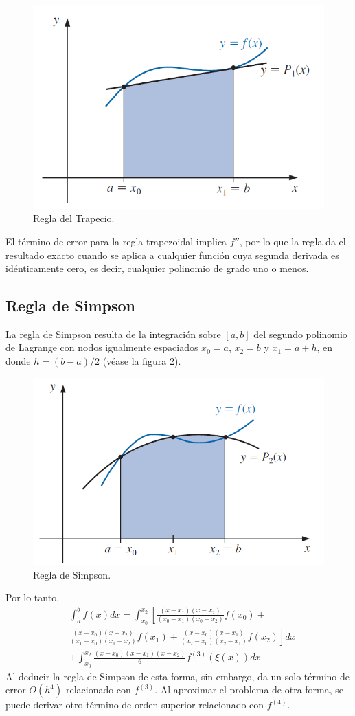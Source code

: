 \begin{figure}[h]
    \centering
    \includegraphics[width = 0.5 \textwidth]{Imagenes/5 - Regla del Trapecio.png}
    \caption{Regla del Trapecio.}
    \label{fig: Regla del Trapecio}
\end{figure}

El término de error para la regla trapezoidal implica $f''$, por lo que la regla da el resultado exacto cuando se aplica a cualquier función cuya segunda derivada es idénticamente cero, es decir, cualquier polinomio de grado uno o menos.

\subsection{Regla de Simpson}
La regla de Simpson resulta de la integración sobre $[a, b]$ del segundo polinomio de Lagrange con nodos igualmente espaciados $x_0 = a$, $x_2 = b$ y $x_1 = a + h$, en donde $h = (b - a)/2$ (véase la figura \ref{fig: Regla de Simpson}).

\begin{figure}[h]
    \centering
    \includegraphics[width = 0.5 \textwidth]{Imagenes/5 - Regla de Simpson.png}
    \caption{Regla de Simpson.}
    \label{fig: Regla de Simpson}
\end{figure}
Por lo tanto,
\begin{align*}
    & \int_{a}^{b} f(x) dx = \int_{x_0}^{x_2} \left[ \frac{(x - x_1)(x - x_2)}{(x_0 - x_1)(x_0 - x_2)} f(x_0) + \right. \\ 
    & \left. \frac{(x - x_0)(x - x_2)}{(x_1 - x_0)(x_1 - x_2)} f(x_1) + \frac{(x - x_0)(x - x_1)}{(x_2 - x_0)(x_2 - x_1)} f(x_2) \right] dx \\
    & + \int_{x_0}^{x_2} \frac{(x - x_0)(x - x_1) (x - x_2)}{6} f^{(3)} (\xi(x)) dx
\end{align*}
Al deducir la regla de Simpson de esta forma, sin embargo, da un solo término de error $O(h^4)$ relacionado con $f^{(3)}$. Al aproximar el problema de otra forma, se puede derivar otro término de orden superior relacionado con $f^{(4)}$.


